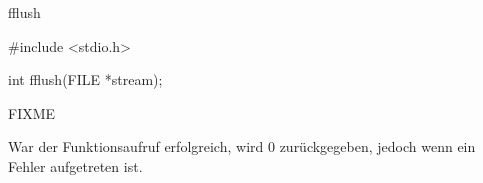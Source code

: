 \begin{man}{fflush}
    \begin{synopsis}
        \begin{plaincode}[gobble=8]
            #include <stdio.h>

            int fflush(FILE *stream);
        \end{plaincode}
    \end{synopsis}

    \begin{desc}
        FIXME
    \end{desc}


    \begin{returns}
        War der Funktionsaufruf erfolgreich, wird 0 zurückgegeben,  jedoch wenn ein Fehler aufgetreten ist.
    \end{returns}

\end{man}

